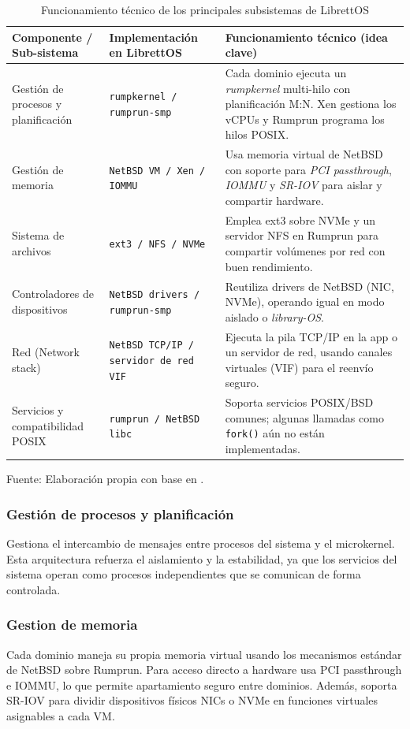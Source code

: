 \begin{table}[H]
\centering
\caption{Funcionamiento técnico de los principales subsistemas de LibrettOS}
\begin{tabular}{|p{3cm}|p{3cm}|p{9cm}|}
\hline
\textbf{Componente / Sub-sistema} & \textbf{Implementación en LibrettOS} & \textbf{Funcionamiento técnico (idea clave)} \\ \hline
Gestión de procesos y planificación & \texttt{rumpkernel / rumprun-smp} & Cada dominio ejecuta un \textit{rumpkernel} multi-hilo con planificación M:N. Xen gestiona los vCPUs y Rumprun programa los hilos POSIX. \\ \hline
Gestión de memoria & \texttt{NetBSD VM / Xen / IOMMU} & Usa memoria virtual de NetBSD con soporte para \textit{PCI passthrough}, \textit{IOMMU} y \textit{SR-IOV} para aislar y compartir hardware. \\ \hline
Sistema de archivos & \texttt{ext3 / NFS / NVMe} & Emplea ext3 sobre NVMe y un servidor NFS en Rumprun para compartir volúmenes por red con buen rendimiento. \\ \hline
Controladores de dispositivos & \texttt{NetBSD drivers / rumprun-smp} & Reutiliza drivers de NetBSD (NIC, NVMe), operando igual en modo aislado o \textit{library-OS}. \\ \hline
Red (Network stack) & \texttt{NetBSD TCP/IP / servidor de red VIF} & Ejecuta la pila TCP/IP en la app o un servidor de red, usando canales virtuales (VIF) para el reenvío seguro. \\ \hline
Servicios y compatibilidad POSIX & \texttt{rumprun / NetBSD libc} & Soporta servicios POSIX/BSD comunes; algunas llamadas como \texttt{fork()} aún no están implementadas. \\ \hline
\end{tabular}
\label{fig:TablaLibrettOS}
\centering
Fuente: Elaboración propia con base en \citep{nikolaev2021librettos}.
\end{table}
\subsubsection{Gestión de procesos y planificación}
Gestiona el intercambio de mensajes entre procesos del sistema y el microkernel. Esta arquitectura refuerza el aislamiento y la estabilidad, ya que los servicios del sistema operan como procesos independientes que se comunican de forma controlada.
\subsubsection{Gestion de memoria}
Cada dominio maneja su propia memoria virtual usando los mecanismos estándar de NetBSD sobre Rumprun. Para acceso directo a hardware usa PCI passthrough e IOMMU, lo que permite apartamiento seguro entre dominios. Además, soporta SR-IOV para dividir dispositivos físicos NICs o NVMe en funciones virtuales asignables a cada VM.
